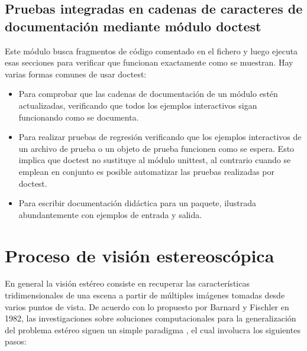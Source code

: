 \subsection{Pruebas integradas en cadenas de caracteres de documentación mediante módulo doctest}
Este módulo busca fragmentos de código comentado en el fichero y luego ejecuta esas secciones para verificar que funcionan exactamente como se muestran. Hay varias formas comunes de usar doctest:
\begin{itemize}
    \item Para comprobar que las cadenas de documentación de un módulo estén actualizadas, verificando que todos los ejemplos interactivos sigan funcionando como se documenta.
    \item Para realizar pruebas de regresión verificando que los ejemplos interactivos de un archivo de prueba o un objeto de prueba funcionen como se espera. Esto implica que doctest no sustituye al módulo unittest, al contrario cuando se emplean en conjunto es posible automatizar las pruebas realizadas por doctest.
    \item Para escribir documentación didáctica para un paquete, ilustrada abundantemente con ejemplos de entrada y salida.
\end{itemize}
\section{Proceso de visión estereoscópica}
 En general la visión estéreo consiste en recuperar las características tridimensionales de una escena a partir de múltiples imágenes tomadas desde varios puntos de vista. De acuerdo con lo propuesto por Barnard y Fischler en 1982, las investigaciones sobre soluciones computacionales para la generalización del problema estéreo siguen un simple paradigma \cite{Barnard1982}, el cual involucra los siguientes pasos:
